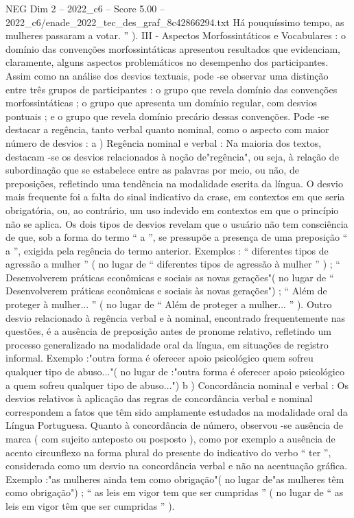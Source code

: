 \begin{textsample}{NEG Dim 2 – 2022\_c6 – Score 5.00 – 2022\_c6/enade\_2022\_tec\_des\_graf\_8c42866294.txt}
Há pouquíssimo tempo, as mulheres passaram a votar. ” ).
III - Aspectos Morfossintáticos e Vocabulares : o domínio das convenções morfossintáticas apresentou resultados que evidenciam, claramente, alguns aspectos problemáticos no desempenho dos participantes.
Assim como na análise dos desvios textuais, pode -se observar uma distinção entre três grupos de participantes : o grupo que revela domínio das convenções morfossintáticas ; o grupo que apresenta um domínio regular, com desvios pontuais ; e o grupo que revela domínio precário dessas convenções.
Pode -se destacar a regência, tanto verbal quanto nominal, como o aspecto com maior número de desvios : a ) Regência nominal e verbal : Na maioria dos textos, destacam -se os desvios relacionados à noção de"regência", ou seja, à relação de subordinação que se estabelece entre as palavras por meio, ou não, de preposições, refletindo uma tendência na modalidade escrita da língua.
O desvio mais frequente foi a falta do sinal indicativo da crase, em contextos em que seria obrigatória, ou, ao contrário, um uso indevido em contextos em que o princípio não se aplica.
Os dois tipos de desvios revelam que o usuário não tem consciência de que, sob a forma do termo “ a ”, se pressupõe a presença de uma preposição “ a ”, exigida pela regência do termo anterior.
Exemplos : “ diferentes tipos de agressão a mulher ” ( no lugar de “ diferentes tipos de agressão à mulher ” ) ; “ Desenvolverem práticas econômicas e sociais as novas gerações"( no lugar de “ Desenvolverem práticas econômicas e sociais às novas gerações") ; “ Além de proteger à mulher... ” ( no lugar de “ Além de proteger a mulher... ” ).
Outro desvio relacionado à regência verbal e à nominal, encontrado frequentemente nas questões, é a ausência de preposição antes de pronome relativo, refletindo um processo generalizado na modalidade oral da língua, em situações de registro informal.
Exemplo :"outra forma é oferecer apoio psicológico quem sofreu qualquer tipo de abuso..."( no lugar de :"outra forma é oferecer apoio psicológico a quem sofreu qualquer tipo de abuso...") b ) Concordância nominal e verbal : Os desvios relativos à aplicação das regras de concordância verbal e nominal correspondem a fatos que têm sido amplamente estudados na modalidade oral da Língua Portuguesa.
Quanto à concordância de número, observou -se ausência de marca ( com sujeito anteposto ou posposto ), como por exemplo a ausência de acento circunflexo na forma plural do presente do indicativo do verbo “ ter ”, considerada como um desvio na concordância verbal e não na acentuação gráfica.
Exemplo :"as mulheres ainda tem como obrigação"( no lugar de"as mulheres têm como obrigação") ; “ as leis em vigor tem que ser cumpridas ” ( no lugar de “ as leis em vigor têm que ser cumpridas ” ).

\end{textsample}
